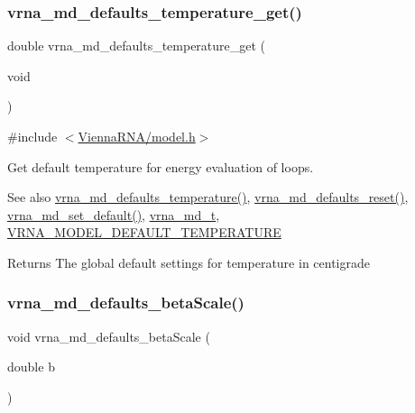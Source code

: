 \subsubsection{\texorpdfstring{vrna\+\_\+md\+\_\+defaults\+\_\+temperature\+\_\+get()}{vrna\_md\_defaults\_temperature\_get()}}
{\footnotesize\ttfamily double vrna\+\_\+md\+\_\+defaults\+\_\+temperature\+\_\+get (\begin{DoxyParamCaption}\item[{void}]{ }\end{DoxyParamCaption})}



{\ttfamily \#include $<$\hyperlink{model_8h}{Vienna\+R\+N\+A/model.\+h}$>$}



Get default temperature for energy evaluation of loops. 

\begin{DoxySeeAlso}{See also}
\hyperlink{group__model__details_gaf9e527e9a2f7e6fd6e42bc6e602f5445}{vrna\+\_\+md\+\_\+defaults\+\_\+temperature()}, \hyperlink{group__model__details_ga70834424cf804d149937de89f80ceb45}{vrna\+\_\+md\+\_\+defaults\+\_\+reset()}, \hyperlink{group__model__details_ga8ac6ff84936282436f822644bf841f66}{vrna\+\_\+md\+\_\+set\+\_\+default()}, \hyperlink{group__model__details_ga1f8a10e12a0a1915f2a4eff0b28ea17c}{vrna\+\_\+md\+\_\+t}, \hyperlink{group__model__details_gaf47f9850b3b4763479f7a7e7a15648a2}{V\+R\+N\+A\+\_\+\+M\+O\+D\+E\+L\+\_\+\+D\+E\+F\+A\+U\+L\+T\+\_\+\+T\+E\+M\+P\+E\+R\+A\+T\+U\+RE} 
\end{DoxySeeAlso}
\begin{DoxyReturn}{Returns}
The global default settings for temperature in centigrade 
\end{DoxyReturn}
\mbox{\label{group__model__details_gae984567db36c3f9b8731ecc917abf3a2}} 
\subsubsection{\texorpdfstring{vrna\+\_\+md\+\_\+defaults\+\_\+beta\+Scale()}{vrna\_md\_defaults\_betaScale()}}
{\footnotesize\ttfamily void vrna\+\_\+md\+\_\+defaults\+\_\+beta\+Scale (\begin{DoxyParamCaption}\item[{double}]{b }\end{DoxyParamCaption})}




